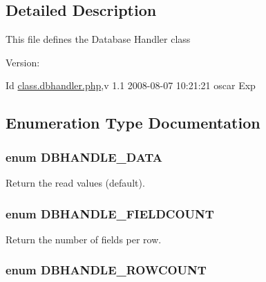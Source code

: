 \subsection{Detailed Description}
This file defines the Database Handler class \begin{Desc}
\item[Version:]\end{Desc}
\begin{Desc}
\item[Id]\hyperlink{class_8dbhandler_8php}{class.dbhandler.php},v 1.1 2008-08-07 10:21:21 oscar Exp \end{Desc}


\subsection{Enumeration Type Documentation}
\hypertarget{class_8dbhandler_8php_cc5178c2a582eafa4ef488ed3394b725}{
\subsubsection{\setlength{\rightskip}{0pt plus 5cm}enum {\bf DBHANDLE\_\-DATA}}}
\label{class_8dbhandler_8php_cc5178c2a582eafa4ef488ed3394b725}


Return the read values (default). 

\hypertarget{class_8dbhandler_8php_fda554c4527b03446f287291626c12ad}{
\subsubsection{\setlength{\rightskip}{0pt plus 5cm}enum {\bf DBHANDLE\_\-FIELDCOUNT}}}
\label{class_8dbhandler_8php_fda554c4527b03446f287291626c12ad}


Return the number of fields per row. 

\hypertarget{class_8dbhandler_8php_c904f05455a162c07c216c330ad7c5c6}{
\subsubsection{\setlength{\rightskip}{0pt plus 5cm}enum {\bf DBHANDLE\_\-ROWCOUNT}}}
\label{class_8dbhandler_8php_c904f05455a162c07c216c330ad7c5c6}


